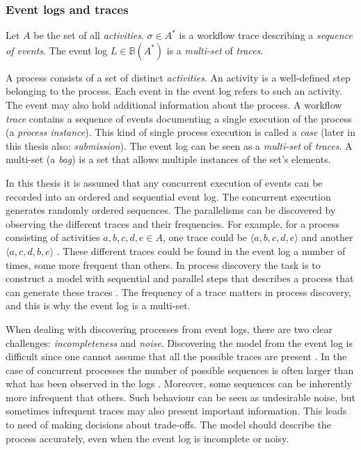 \subsubsection{Event logs and traces}

\label{sec:eventtheory}

\begin{definition}
Let $A$ be the set of all \emph{activities}. 
$\sigma \in A^*$ is a workflow trace describing a \emph{sequence of events}.
The event log $L \in \mathbb{B}(A^*)$ is a \emph{multi-set} of \emph{traces}.
\end{definition}

A process consists of a set of distinct \emph{activities}.
An activity is a well-defined step belonging to the process.
Each event in the event log refers to such an activity.
The event may also hold additional information about the process.
A workflow \emph{trace} contains a sequence of events documenting a single execution of the process (a \emph{process instance}).
This kind of single process execution is called a \emph{case} (later in this thesis also: \emph{submission}).
The event log can be seen as a \emph{multi-set} of \emph{traces}. 
A multi-set (a \emph{bag}) is a set that allows multiple instances of the set's elements. \cite{van2015extracting}

In this thesis it is assumed that any concurrent execution of events can be recorded into
an ordered and sequential event log. 
The concurrent execution generates randomly ordered sequences.
The parallelisms can be discovered by observing the different traces and their frequencies.
For example, for a process consisting of activities $a,b,c,d,e \in A$, one trace could be 
$\langle a,b,c,d,e \rangle$ and another $\langle a,c,d,b,e \rangle$ .
These different traces could be found in the event log a number of times, some more frequent than others.
In process discovery the task is to construct a model with sequential and parallel steps 
that describes a process that can generate these traces \cite{van2013discovering}.
The frequency of a trace matters in process discovery, and this is why the event log is a multi-set.


When dealing with discovering processes from event logs, there are two clear challenges: \emph{incompleteness} and \emph{noise}. 
Discovering the model from the event log is difficult since one cannot assume that all the possible traces are present \cite{van2013discovering}. 
In the case of concurrent processes the number of possible sequences is often larger than what has been observed in the logs \cite{van2007business}.
Moreover, some sequences can be inherently more infrequent that others. 
Such behaviour can be seen as undesirable noise, but sometimes infrequent traces may also present important information.
This leads to need of making decisions about trade-offs. 
The model should describe the process accurately, even when the event log is incomplete or noisy.

